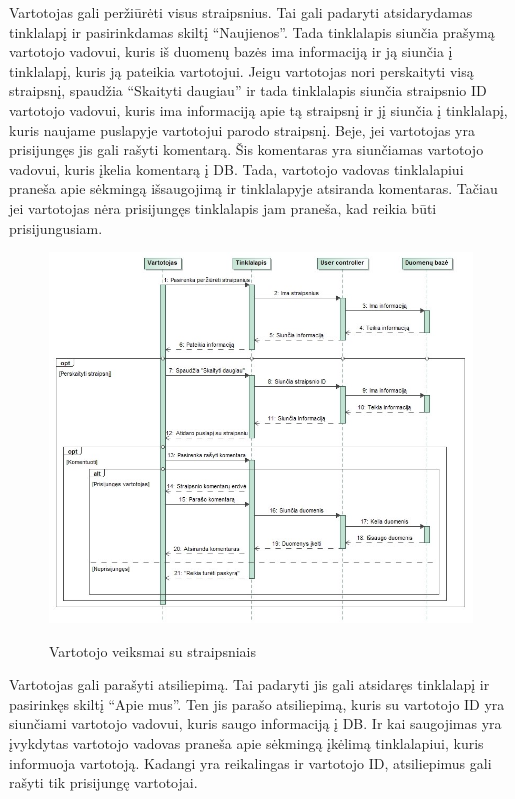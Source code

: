 ﻿\documentclass{VUMIFPSkursinis}
\begin{document}
Vartotojas gali peržiūrėti visus straipsnius. Tai gali padaryti atsidarydamas tinklalapį ir pasirinkdamas skiltį “Naujienos”. Tada tinklalapis siunčia prašymą vartotojo vadovui, kuris iš duomenų bazės ima informaciją ir ją siunčia į tinklalapį, kuris ją pateikia vartotojui. Jeigu vartotojas nori perskaityti visą straipsnį, spaudžia “Skaityti daugiau” ir tada tinklalapis siunčia straipsnio ID vartotojo vadovui, kuris ima informaciją apie tą straipsnį ir jį siunčia į tinklalapį, kuris naujame puslapyje vartotojui parodo straipsnį.
	Beje, jei vartotojas yra prisijungęs jis gali rašyti komentarą. Šis komentaras yra siunčiamas vartotojo vadovui, kuris įkelia komentarą į DB. Tada, vartotojo vadovas tinklalapiui praneša apie sėkmingą išsaugojimą ir tinklalapyje atsiranda komentaras. Tačiau jei vartotojas nėra prisijungęs tinklalapis jam praneša, kad reikia būti prisijungusiam.

\begin{figure}[H]
    \centering
    \includegraphics[scale=0.5]{img/Pav/VartotojasStraips_Komentarai}
    \label{img:uml5}
	\caption{Vartotojo veiksmai su straipsniais}
\end{figure}	
	
Vartotojas gali parašyti atsiliepimą. Tai padaryti jis gali atsidaręs tinklalapį ir pasirinkęs skiltį “Apie mus”. Ten jis parašo atsiliepimą, kuris su vartotojo ID yra siunčiami vartotojo vadovui, kuris saugo informaciją į DB. Ir kai saugojimas yra įvykdytas vartotojo vadovas praneša apie sėkmingą įkėlimą tinklalapiui, kuris informuoja vartotoją. Kadangi yra reikalingas ir vartotojo ID, atsiliepimus gali rašyti tik prisijungę vartotojai.
	
\end{document}
